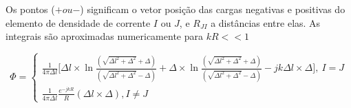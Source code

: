 \documentclass[
	12pt,				%
	openright,			%
	oneside,			%
	a4paper,			%
	english,			%
	brazil				%
	]{abntex2}
\begin{document}
\begin{apendicesenv}
\begin{subequations}
\end{subequations}
Os pontos ($+$$ ou $$-$) significam o vetor posição das cargas negativas e positivas do elemento de densidade de corrente $I$ ou $J$, e $R_{JI}$ a distâncias entre elas. As integrais  são aproximadas numericamente para $kR<<1$

\begin{equation}
   \Phi= \begin{cases}
        \frac{1}{4 \pi \Delta l} \biggl[\Delta l \times \ln{\frac{(\sqrt{{\Delta l}^2+\Delta^2}+\Delta)}{(\sqrt{{\Delta l}^2+\Delta^2}-\Delta)}} 
        + \Delta  \times \ln{\frac{(\sqrt{{\Delta l}^2+\Delta^2}+\Delta)}{(\sqrt{{\Delta l}^2+\Delta^2}-\Delta)}} -jk\Delta l \times \Delta
        \biggl], \ I=J \\
     \frac{1}{4 \pi \Delta l} \frac{e^{-jkR}}{R} ( \Delta l \times \Delta), I \neq J
    \end{cases}
\end{equation}


\end{apendicesenv}
\end{document}
